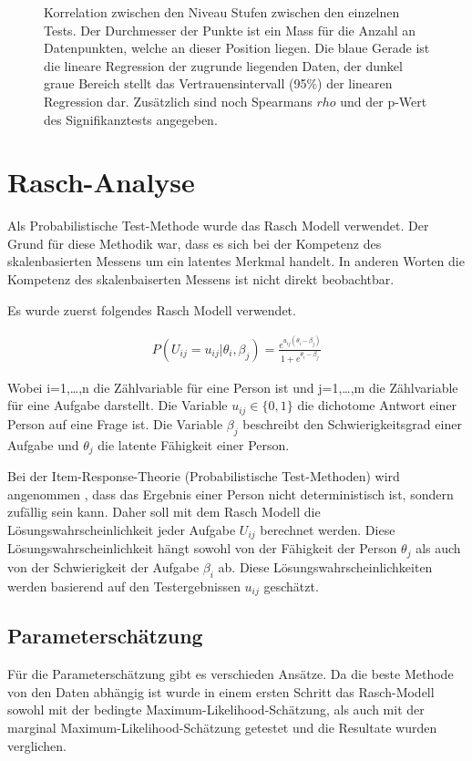 \begin{figure}[htbp]
\caption{Korrelation zwischen den Niveau Stufen zwischen den einzelnen Tests. Der Durchmesser der Punkte ist ein Mass für die Anzahl an Datenpunkten, welche an dieser Position liegen. Die blaue Gerade ist die lineare Regression der zugrunde liegenden Daten, der dunkel graue Bereich stellt das Vertrauensintervall (95\%) der linearen Regression dar. Zusätzlich sind noch Spearmans $rho$ und der p-Wert des Signifikanztests angegeben.}
\label{fig:corLev}
\end{figure}



\section{Rasch-Analyse}

Als Probabilistische Test-Methode wurde das Rasch Modell verwendet. Der Grund für diese Methodik war, dass es sich bei der Kompetenz des skalenbasierten Messens um ein latentes Merkmal handelt. In anderen Worten die Kompetenz des skalenbaiserten Messens ist nicht direkt beobachtbar.

Es wurde zuerst folgendes Rasch Modell verwendet.

\begin{eqnarray}
P(U_{ij}=u_{ij}|\theta_i,\beta_j) = \frac{e^{u_{ij}(\theta_i-\beta_j)}}{1+e^{\theta_i-\beta_j}}
\end{eqnarray}

Wobei i=1,…,n die Zählvariable für eine Person ist und j=1,…,m die Zählvariable für eine Aufgabe darstellt. Die Variable $u_{ij} \in \{0,1\}$ die dichotome Antwort einer Person auf eine Frage ist. Die Variable $\beta_j$ beschreibt den Schwierigkeitsgrad einer Aufgabe und $\theta_j$ die latente Fähigkeit einer Person.

Bei der Item-Response-Theorie (Probabilistische Test-Methoden) wird angenommen , dass das Ergebnis einer Person nicht deterministisch ist, sondern zufällig sein kann. Daher soll mit dem Rasch Modell die Lösungswahrscheinlichkeit jeder Aufgabe $U_{ij}$ berechnet werden. Diese Lösungswahrscheinlichkeit hängt sowohl von der Fähigkeit der Person $\theta_j$ als auch von der Schwierigkeit der Aufgabe $\beta_i$ ab. Diese Lösungswahrscheinlichkeiten werden basierend auf den Testergebnissen $u_{ij}$ geschätzt.

\subsection{Parameterschätzung}
Für die Parameterschätzung gibt es verschieden Ansätze. Da die beste Methode von den Daten abhängig ist wurde in einem ersten Schritt das Rasch-Modell sowohl mit der bedingte Maximum-Likelihood-Schätzung, als auch mit der marginal Maximum-Likelihood-Schätzung getestet und die Resultate wurden verglichen. 

